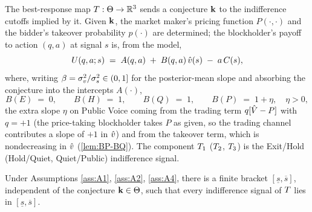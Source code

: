 The best-response map $T:\Theta\to\mathbb{R}^3$ sends a conjecture $\mathbf{k}$ to the
indifference cutoffs implied by it. Given $\mathbf{k}$, the market maker's pricing
function $P(\cdot,\cdot)$ and the bidder's takeover probability $p(\cdot)$ are
determined; the blockholder's payoff to action $(q,a)$ at signal $s$ is, from the
model,
\begin{equation}
\label{eq:payoff-affine}
U(q,a;s) \;=\; A(q,a)\;+\; B(q,a)\,\hat{v}(s)\;-\;a\,C(s),
\end{equation}
where, writing $\beta=\sigma_v^2/\sigma_s^2\in(0,1]$ for the posterior-mean slope and
absorbing the conjecture into the intercepts $A(\cdot)$,
\begin{equation}
\label{eq:slopes}
B(E)\;=\;0,\qquad B(H)\;=\;1,\qquad B(Q)\;=\;1,\qquad B(P)\;=\;1+\eta,
\quad \eta>0,
\end{equation}
the extra slope $\eta$ on Public Voice coming from the trading term
$q[\hat{V}-P]$ with $q=+1$ (the price-taking blockholder takes $P$ as given, so the
trading channel contributes a slope of $+1$ in $\hat{v}$) and from the takeover
term, which is nondecreasing in $\hat{v}$ (\ref{lem:BP-BQ}). The component
$T_1$ ($T_2$, $T_3$) is the Exit/Hold (Hold/Quiet, Quiet/Public)
indifference signal.

\begin{lemma}
\label{lem:bounded}
Under Assumptions \ref{ass:A1}, \ref{ass:A2}, \ref{ass:A4}, there is a finite
bracket $[\underline{s},\overline{s}]$, independent of the conjecture
$\mathbf{k}\in\Theta$, such that every indifference signal of $T$ lies in
$[\underline{s},\overline{s}]$.
\end{lemma}


